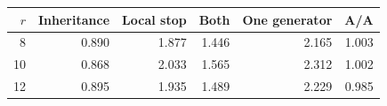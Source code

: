 \begin{center}
\small
\begin{tabular}{rrrrrr}
\toprule
$r$ & Inheritance & Local stop & Both & One generator & A/A\\
\midrule
8 & 0.890 & 1.877 & 1.446 & 2.165 & 1.003\\
10 & 0.868 & 2.033 & 1.565 & 2.312 & 1.002\\
12 & 0.895 & 1.935 & 1.489 & 2.229 & 0.985\\
\bottomrule
\end{tabular}
\end{center}

